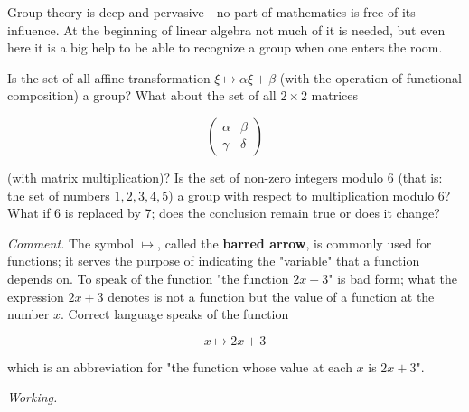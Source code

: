 Group theory is deep and pervasive - no part of mathematics is free of its influence. At the beginning of linear algebra not much of it is needed, but even here it is a big help to be able to recognize a group when one enters the room.

\begin{problem}
Is the set of all affine transformation $\xi \mapsto \alpha\xi + \beta$ (with the operation of functional composition) a group? What about the set of all $2 \times 2$ matrices

\[
  \begin{pmatrix}
    \alpha & \beta  \\
    \gamma & \delta
  \end{pmatrix}
\]

(with matrix multiplication)? Is the set of non-zero integers modulo 6 (that is: the set of numbers $1,2,3,4,5$) a group with respect to multiplication modulo 6? What if 6 is replaced by 7; does the conclusion remain true or does it change?
\end{problem}

\textit{Comment.} The symbol $\mapsto$, called the \textbf{barred arrow}, is commonly used for functions; it serves the purpose of indicating the "variable" that a function depends on. To speak of the function "the function $2x+3$" is bad form; what the expression $2x+3$ denotes is not a function but the value of a function at the number $x$. Correct language speaks of the function

\begin{equation}
  x \mapsto 2x + 3
\end{equation}

which is an abbreviation for "the function whose value at each $x$ is $2x+3$".

\begin{minipage}{300px}
  \textit{Working.}
\end{minipage}